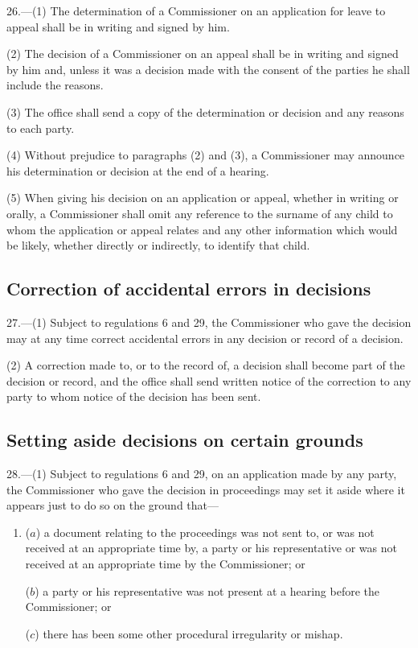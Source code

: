 \documentclass[12pt,a4paper]{article}
\begin{document}
\renewcommand\parthead{--- Part IV}

26.—(1) The determination of a Commissioner on an application for leave to appeal shall be in writing and signed by him.

(2) The decision of a Commissioner on an appeal shall be in writing and signed by him and, unless it was a decision made with the consent of the parties he shall include the reasons.

(3) The office shall send a copy of the determination or decision and any reasons to each party.

(4) Without prejudice to paragraphs (2) and (3), a Commissioner may announce his determination or decision at the end of a hearing.

(5) When giving his decision on an application or appeal, whether in writing or orally, a Commissioner shall omit any reference to the surname of any child to whom the application or appeal relates and any other information which would be likely, whether directly or indirectly, to identify that child.

\subsection[27. Correction of accidental errors in decisions]{Correction of accidental errors in decisions}

27.—(1) Subject to regulations 6 and 29, the Commissioner who gave the decision may at any time correct accidental errors in any decision or record of a decision.

(2) A correction made to, or to the record of, a decision shall become part of the decision or record, and the office shall send written notice of the correction to any party to whom notice of the decision has been sent.

\subsection[28. Setting aside decisions on certain grounds]{Setting aside decisions on certain grounds}

28.—(1) Subject to regulations 6 and 29, on an application made by any party, the Commissioner who gave the decision in proceedings may set it aside where it appears just to do so on the ground that---
\begin{enumerate}\item[]
($a$) a document relating to the proceedings was not sent to, or was not received at an appropriate time by, a party or his representative or was not received at an appropriate time by the Commissioner; or

($b$) a party or his representative was not present at a hearing before the Commissioner; or

($c$) there has been some other procedural irregularity or mishap.
\end{enumerate}
\end{document}
